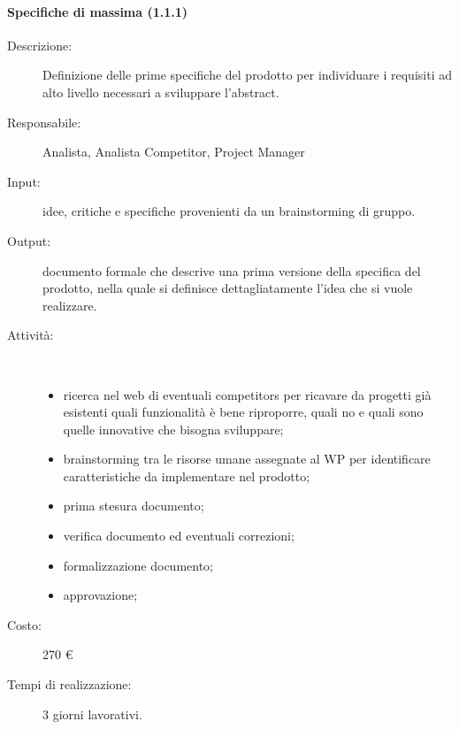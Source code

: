 \paragraph{Specifiche di massima (1.1.1)}
\begin{description}
\item[Descrizione:] Definizione delle prime specifiche del prodotto per individuare i requisiti ad alto livello necessari a sviluppare l'abstract.
\item[Responsabile:] Analista, Analista Competitor, Project Manager
\item[Input:] idee, critiche e specifiche provenienti da un brainstorming di gruppo.
\item[Output:] documento formale che descrive una prima versione della specifica del prodotto, nella quale si definisce dettagliatamente l'idea che si vuole realizzare.
\item[Attività:]\mbox{}\\[-1.5\baselineskip]
	\begin{itemize}
	\item ricerca nel web di eventuali competitors per ricavare da progetti gi\`{a} esistenti quali funzionalit\`{a} \`{e} bene riproporre, quali no e quali sono quelle innovative che bisogna sviluppare;
	\item brainstorming tra le risorse umane assegnate al WP per identificare caratteristiche da implementare nel prodotto;
	\item prima stesura documento;
	\item verifica documento ed eventuali correzioni;
	\item formalizzazione documento;
	\item approvazione;
	\end{itemize}
\item[Costo:] 270 \euro{}
\item[Tempi di realizzazione:] 3 giorni lavorativi.
\end{description}

